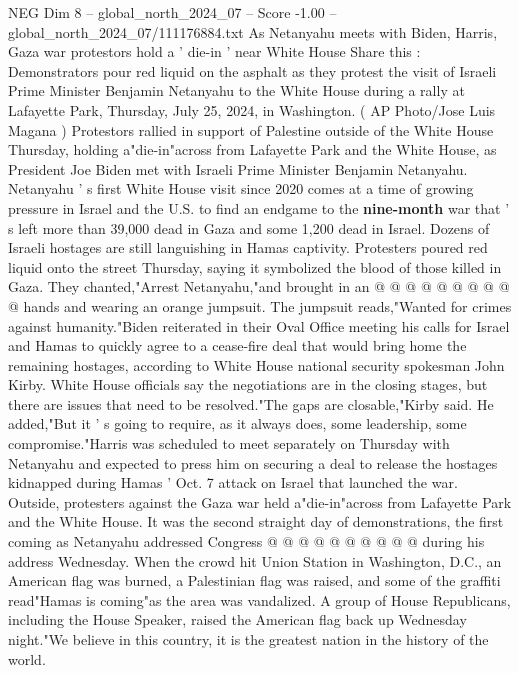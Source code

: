 \begin{textsample}{NEG Dim 8 – global\_north\_2024\_07 – Score -1.00 – global\_north\_2024\_07/111176884.txt}  \label{ex:f8_neg_184}
As Netanyahu meets with Biden, Harris, Gaza war protestors hold a ' die-in ' near White House Share this : Demonstrators pour red liquid on the asphalt as they protest the visit of Israeli Prime Minister Benjamin Netanyahu to the White House during a rally at Lafayette Park, Thursday, July 25, 2024, in Washington. ( AP Photo/Jose Luis Magana ) Protestors rallied in support of Palestine outside of the White House Thursday, holding a"die-in"across from Lafayette Park and the White House, as President Joe Biden met with Israeli Prime Minister Benjamin Netanyahu.
Netanyahu ' s first White House visit since 2020 comes at a time of growing pressure in Israel and the U.S. to find an endgame to the \textbf{nine-month} war that ' s left more than 39,000 dead in Gaza and some 1,200 dead in Israel.
Dozens of Israeli hostages are still languishing in Hamas captivity.
Protesters poured red liquid onto the street Thursday, saying it symbolized the blood of those killed in Gaza.
They chanted,"Arrest Netanyahu,"and brought in an @ @ @ @ @ @ @ @ @ @ hands and wearing an orange jumpsuit.
The jumpsuit reads,"Wanted for crimes against humanity."Biden reiterated in their Oval Office meeting his calls for Israel and Hamas to quickly agree to a cease-fire deal that would bring home the remaining hostages, according to White House national security spokesman John Kirby.
White House officials say the negotiations are in the closing stages, but there are issues that need to be resolved."The gaps are closable,"Kirby said.
He added,"But it ' s going to require, as it always does, some leadership, some compromise."Harris was scheduled to meet separately on Thursday with Netanyahu and expected to press him on securing a deal to release the hostages kidnapped during Hamas ' Oct. 7 attack on Israel that launched the war.
Outside, protesters against the Gaza war held a"die-in"across from Lafayette Park and the White House.
It was the second straight day of demonstrations, the first coming as Netanyahu addressed Congress @ @ @ @ @ @ @ @ @ @ during his address Wednesday.
When the crowd hit Union Station in Washington, D.C., an American flag was burned, a Palestinian flag was raised, and some of the graffiti read"Hamas is coming"as the area was vandalized.
A group of House Republicans, including the House Speaker, raised the American flag back up Wednesday night."We believe in this country, it is the greatest nation in the history of the world.

\end{textsample}
